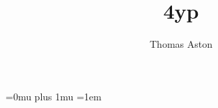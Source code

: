 \documentclass[12pt]{article}%
\title{4yp}
\author{Thomas Aston}
\begin{document}
  \maketitle

 


  



  \Urlmuskip=0mu plus 1mu
  \emergencystretch=1em
  \printbibliography{}
\end{document}
